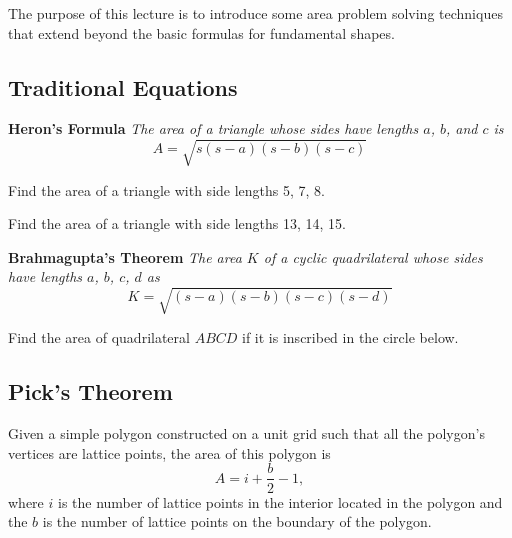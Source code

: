 The purpose of this lecture is to introduce some area problem solving techniques that extend beyond the basic formulas for fundamental shapes.
	
	\subsection{Traditional Equations}
	\textbf{Heron's Formula} \textit{The area of a triangle whose sides have lengths $a$, $b$, and $c$ is
  $$ A = \sqrt{s(s-a)(s-b)(s-c)}$$}	
	
	\begin{problem}
	Find the area of a triangle with side lengths 5, 7, 8.
	\end{problem}
	
	\begin{problem}
	Find the area of a triangle with side lengths 13, 14, 15.
	\end{problem}
	
	\noindent \textbf{Brahmagupta's Theorem} \textit{The area $K$ of a cyclic quadrilateral whose sides have lengths $a$, $b$, $c$, $d$ as
  $$ K=\sqrt{(s-a)(s-b)(s-c)(s-d)}$$}

	\begin{problem}
	Find the area of quadrilateral $ABCD$ if it is inscribed in the circle below.
	\begin{center}
	\end{center}
	\end{problem}
	
	\clearpage

	\subsection{Pick's Theorem}
	\begin{theorem}
	Given a simple polygon constructed on a unit grid such that all the polygon's vertices are lattice points, the area of this polygon is 
    $$A = i + \frac{b}{2} - 1, $$
		where $i$ is the number of lattice points in the interior located in the polygon and the $b$ is the number of lattice points on the boundary of the polygon.
	\end{theorem}
	
